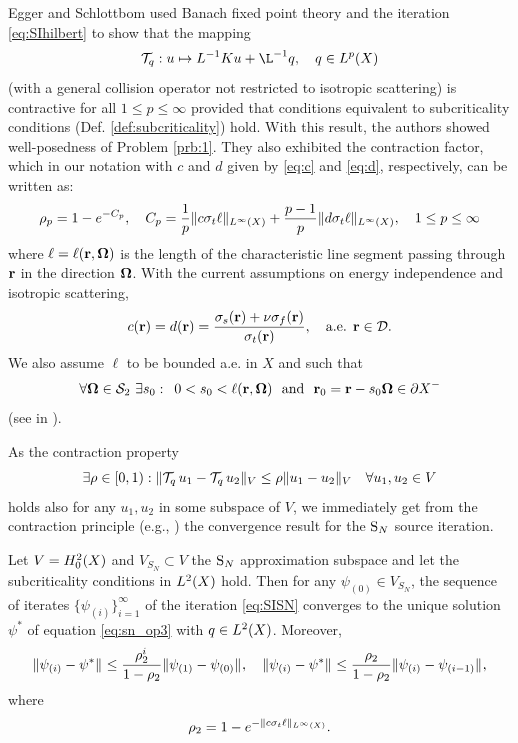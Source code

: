 Egger and Schlottbom \cite{Egger} used Banach fixed point theory and the iteration \eqref{eq:SIhilbert} to show that the 
mapping $$ \mathcal{T}_q : u \mapsto L^{-1}K u + \L^{-1} q, \quad q \in \Lp(X)$$ (with a general collision operator not
restricted to isotropic scattering) is contractive for all $1 \leq p \leq \infty$ provided that conditions equivalent to
subcriticality conditions (Def. \ref{def:subcriticality}) hold. With this result, the authors showed well-posedness of Problem
\ref{prb:1}. 
They also exhibited the contraction factor, which in our notation with $c$ and $d$ given by \eqref{eq:c} and
\eqref{eq:d}, respectively, can be written as:
\begin{equation}\label{eq:contraction_factor}
	\rho_p = 1 - e^{-C_p}, \quad C_p = \frac{1}{p}\norm[{\Lp[\infty](X)}]{c\sigma_t\ell} +
	\frac{p-1}{p}\norm[{\Lp[\infty](X)}]{d\sigma_t\ell}, \quad 1 \leq p \leq \infty
\end{equation}
where $\ell = \ell(\br,\bomega)$ is the length of the characteristic line segment passing through $\br$ in the
direction $\bomega$. With the current assumptions on energy independence and isotropic scattering,
$$
	c(\br) = d(\br) = \frac{\sigma_s(\br) + \nu\sigma_f(\br)}{\sigma_t(\br)},\quad \text{a.e. } \br\in\VV.
$$
We also assume $\ell$ to be bounded a.e.
in $X$ and such that $$
	\forall \bomega \in \Sphere\ \exists s_0:\ \, 0 < s_0 < \ell(\br,\bomega)\ \mbox{ and }\ \br_0 = \br - s_0 \bomega \in
	\pX[-]
$$
(see  in ). 

As the contraction property
$$
\exists \rho \in [0, 1): \norm[V]{\mathcal{T}_q\, u_1 - \mathcal{T}_q\, u_2} \leq \rho \norm[V]{u_1 - u_2}\quad
\forall u_1,u_2 \in V $$
holds also for any $u_1,u_2$ in some subspace of $V$, we immediately get from the
contraction principle (e.g., \cite[Thm.
2.3.1]{DrabekNFA}) the convergence result for the $\SN$ source iteration. 
\begin{theorem}\label{thm:3}
	Let $V = \Hpnot[2](X)$ and $V_{S_N} \subset V$ the $\SN$ approximation subspace and let the subcriticality conditions
	in $\Lp[2](X)$ hold. 
	Then for any $\psi_{(0)} \in V_{S_N}$, the sequence of iterates $\{\psi_{(i)}\}_{i=1}^{\infty}$ of
	the iteration \eqref{eq:SISN} converges to the unique solution $\psi^*$ of equation \eqref{eq:sn_op3} with $q \in
	\Lp[2](X)$.
	Moreover, 
	$$
		\norm{\psi_{(i)} - \psi^*} \leq \frac{\rho_2^{i}}{1-\rho_2} \norm{\psi_{(1)} - \psi_{(0)}},\quad
		\norm{\psi_{(i)} - \psi^*} \leq \frac{\rho_2}{1-\rho_2} \norm{\psi_{(i)} - \psi_{(i-1)}},
	$$
	where 
	\begin{equation}\label{eq:rho2}
		\rho_2 = 1 - e^{-\norm[{\Lp[\infty](X)}]{c\sigma_t\ell}}.
\end{equation}
\end{theorem}

